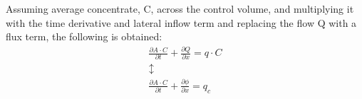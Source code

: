 Assuming average concentrate, C, across the control volume, and multiplying it with the time derivative and lateral inflow term and replacing the flow Q with a flux term, the following is obtained:
\begin{equation}
\begin{array}{l}
	\frac{\partial A \cdot C}{\partial t} + \frac{\partial Q}{\partial x}=q \cdot C \\
	\updownarrow \\
	\frac{\partial A \cdot C}{\partial t} + \frac{\partial \phi}{\partial x}=q_c \\
\end{array}	
\label{poop_mass_equation}
\end{equation}










